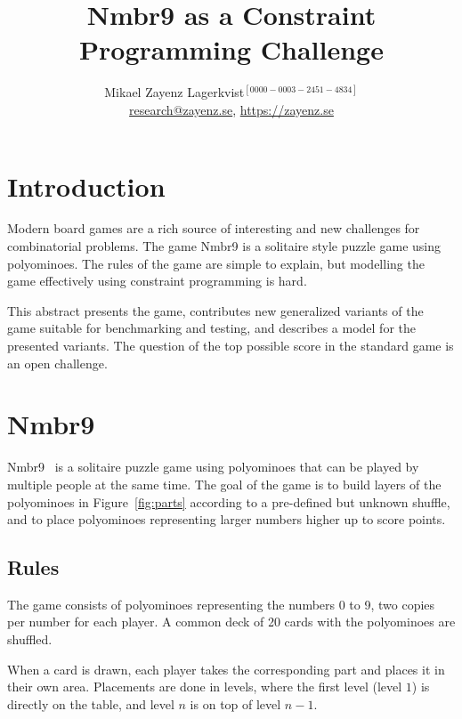 \documentclass[letterpaper]{article} %
\def\orcidID#1{\unskip$^{[#1]}$}
\begin{document}
\title{Nmbr9 as a Constraint Programming Challenge}
\author{Mikael Zayenz Lagerkvist\orcidID{0000-0003-2451-4834}\\
  \url{research@zayenz.se}, \url{https://zayenz.se}}

\maketitle

\section{Introduction}
\label{sec:introduction}

Modern board games are a rich source of interesting and new challenges
for combinatorial problems. The game Nmbr9 is a solitaire style puzzle
game using polyominoes. The rules of the game are simple to explain,
but modelling the game effectively using constraint programming is
hard.

This abstract presents the game, contributes new generalized variants
of the game suitable for benchmarking and testing, and describes a
model for the presented variants. The question of the top possible
score in the standard game is an open challenge.

\section{Nmbr9}
\label{sec:nmbr9}

Nmbr9~\cite{game:nmbr9} is a solitaire puzzle game using polyominoes
that can be played by multiple people at the same time. The goal of
the game is to build layers of the polyominoes in
Figure~\ref{fig:parts} according to a pre-defined but unknown shuffle,
and to place polyominoes representing larger numbers higher up to
score points. 

\subsection{Rules}
\label{sec:nmbr9:rules}

The game consists of polyominoes representing the numbers 0 to 9, two
copies per number for each player. A common deck of 20 cards with the
polyominoes are shuffled.

When a card is drawn, each player takes the corresponding part and
places it in their own area. Placements are done in levels, where the
first level (level $1$) is directly on the table, and level $n$ is on top of
level $n-1$.
\end{document}
